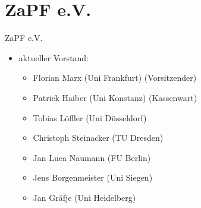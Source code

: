 \documentclass[compress, aspectratio=169]{beamer}
\begin{document}
\section{ZaPF e.V.}

\begin{frame}{ZaPF e.V.}
  \begin{itemize}
  \item[] aktueller Vorstand:
    \begin{itemize}
    \item Florian Marx (Uni Frankfurt) (Vorsitzender)
    \item Patrick Haiber (Uni Konstanz) (Kassenwart)
    \item Tobias Löffler (Uni Düsseldorf)
    \item Christoph Steinacker (TU Dresden)
    \item Jan Luca Naumann (FU Berlin)
    \item Jens Borgenmeister (Uni Siegen)
    \item Jan Gräfje (Uni Heidelberg)
    \end{itemize}
  \end{itemize}
\end{frame} 
\end{document}
